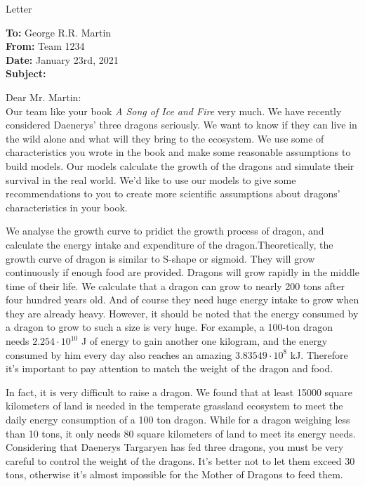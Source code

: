 \documentclass{mcmthesis}
\begin{document}
\newpage
\begin{letter}{Letter}
\begin{flushleft}  %
\textbf{To:} George R.R. Martin\\
\textbf{From:} Team 1234\\
\textbf{Date:} January 23rd, 2021\\
\textbf{Subject:} 
\end{flushleft}

Dear Mr. Martin:\\

Our team like your book \emph{A Song of Ice and Fire} very much. We have recently considered Daenerys' three dragons seriously. 
We want to know if they can live in the wild alone and what will they bring to the ecosystem. We use some of characteristics
you wrote in the book and make some reasonable assumptions to build models. Our models calculate the growth of the dragons
and simulate their survival in the real world. We'd like to use our models to give some recommendations to you to create
more scientific assumptions about dragons’ characteristics in your book.

We analyse the growth curve to pridict the growth process of dragon, and calculate the energy intake and expenditure of the dragon.Theoretically, the growth curve of dragon is similar to S-shape or sigmoid. They will grow continuously if enough food are provided. Dragons will grow rapidly in the middle time of their life. We calculate that a dragon can grow to nearly 200 tons after four hundred years old. And of course they need huge energy intake to grow when they are already heavy. However, it should be noted that the energy consumed by a dragon to grow to such a size is very huge. For example, a 100-ton dragon needs $2.254 \cdot 10^{10}$ J of energy to gain another one kilogram, and the energy consumed by him every day also reaches an amazing $3.83549 \cdot 10^{8}$ kJ. Therefore it's important to pay attention to match the weight of the dragon and food.

In fact, it is very difficult to raise a dragon. We found that at least 15000 square kilometers of land is needed in the temperate grassland ecosystem to meet the daily energy consumption of a 100 ton dragon. While for a dragon weighing less than 10 tons, it only needs 80 square kilometers of land to meet its energy needs. Considering that Daenerys Targaryen has fed three dragons, you must be very careful to control the weight of the dragons. It's better not to let them exceed 30 tons, otherwise it's almost impossible for the Mother of Dragons to feed them.


\end{letter}
\end{document}
